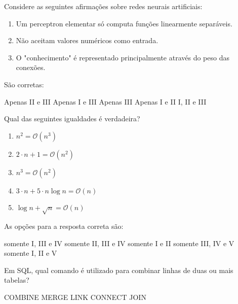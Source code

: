\documentclass[12pt, addpoints]{exam}
\begin{document}
\begin{questions}
\question

Considere as seguintes afirmações sobre redes neurais artificiais: \begin{enumerate}[label=\Roman*.] \item Um perceptron elementar só computa funções linearmente separáveis. \item Não aceitam valores numéricos como entrada. \item O "conhecimento" é representado principalmente através do peso das conexões. \end{enumerate} São corretas:
\begin{choices}
\choice Apenas II e III
\choice Apenas I e III
\choice Apenas III
\choice Apenas I e II 
\choice I, II e III
\end{choices}

\question

Qual das seguintes igualdades é verdadeira?



\begin{enumerate}

    \item[(I)] \( n^2 = \mathcal{O}(n^3) \)

    \item[(II)] \( 2 \cdot n + 1 = \mathcal{O}(n^2) \)

    \item[(III)] \( n^3 = \mathcal{O}(n^2) \)

    \item[(IV)] \( 3 \cdot n + 5 \cdot n \log n = \mathcal{O}(n) \)

    \item[(V)] \( \log n + \sqrt{n} = \mathcal{O}(n) \)

\end{enumerate}



As opções para a resposta correta são:
\begin{choices}
\choice somente I, III e IV
\choice somente II, III e IV
\choice somente I e II
\choice somente III, IV e V
\choice somente I, II e V
\end{choices}

\question

Em SQL, qual comando é utilizado para combinar linhas de duas ou mais tabelas?


\begin{choices}
\choice COMBINE
\choice MERGE
\choice LINK
\choice CONNECT
\choice JOIN
\end{choices}


\end{questions}
\end{document}
